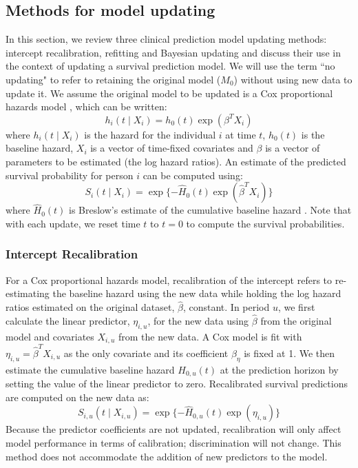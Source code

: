 \documentclass[]{article}
\begin{document}
\subsection{Methods for model updating}
\label{sec:MethUpdate}

In this section, we review three clinical prediction model updating methods: intercept recalibration, refitting and Bayesian updating and discuss their use in the context of updating a survival prediction model. We will use the term ``no updating" to refer to retaining the original model ($M_0$) without using new data to update it. We assume the original model to be updated is a Cox proportional hazards model \citep{Cox1972}, which can be written:
\begin{equation}\label{eqn:Cox}
	h_i(t \mid X_i) = h_0(t) \exp(\beta^TX_i)
\end{equation}
where $h_i(t \mid X_i)$ is the hazard for the individual $i$ at time $t$, $h_0(t)$ is the baseline hazard, $X_i$ is a vector of time-fixed covariates and $\beta$ is a vector of parameters to be estimated (the log hazard ratios). An estimate of the predicted survival probability for person $i$ can be computed using:
\begin{equation}
	S_i(t \mid X_i) = \exp\lbrace -\hat{H}_0(t) \exp ( \hat{\beta}^TX_i ) \rbrace 
\end{equation}    
where $\hat{H}_0(t)$ is Breslow's estimate of the cumulative baseline hazard \citep{Breslow1972}. Note that with each update, we reset time $t$ to $t=0$ to compute the survival probabilities.




\subsubsection{Intercept Recalibration}
For a Cox proportional hazards model, recalibration of the intercept refers to re-estimating the baseline hazard using the new data while holding the log hazard ratios estimated on the original dataset, $\hat{\beta}$, constant. In period $u$, we first calculate the linear predictor, $\eta_{i,u}$, for the new data using $\hat{\beta}$ from the original model and covariates $X_{i,u}$ from the new data. A Cox model is fit with $\eta_{i,u} = \hat{\beta}^TX_{i,u}$ as the only covariate and its coefficient $\beta_{\eta}$ is fixed at 1. We then estimate the cumulative baseline hazard $H_{0,u}(t)$ at the prediction horizon by setting the value of the linear predictor to zero. Recalibrated survival predictions are computed on the new data as:
\begin{equation}
	S_{i,u}(t \mid X_{i,u}) = \exp\lbrace -\hat{H}_{0,u}(t) \exp ( \eta_{i,u} ) \rbrace 
\end{equation}    
Because the predictor coefficients are not updated, recalibration will only affect model performance in terms of calibration; discrimination will not change. This method does not accommodate the addition of new predictors to the model.
\end{document}
